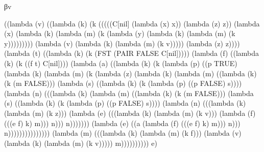 \documentclass[ms,electronic,twosidetoc,letterpaper,chaptercenter,parttop]{byumsphd}
\begin{document}
\begin{theorem}
βv
\begin{schemedisplay}
((lambda (v) ((lambda (k) (k (((((C[nil] (lambda (x) x)) (lambda (z) z))
                    (lambda (x) (lambda (k) (lambda (m) (k (lambda (y) (lambda (k) (lambda (m) (k y)))))))))
                   (lambda (v) (lambda (k) (lambda (m) (k v))))) (lambda (z) z))))
        (lambda (t) ((lambda (k) (k (FST
                         (PAIR FALSE C[nil]))))
               (lambda (f) ((lambda (k) (k ((f t) C[nil])))
                      (lambda (a) ((lambda (k) (k (lambda (p) ((p TRUE)
                                             (lambda (k) (lambda (m) (k (lambda (z) (lambda (k) (lambda (m) ((lambda (k) (k (m FALSE)))
                                                                               (lambda (s) ((lambda (k) (k (lambda (p) ((p FALSE) s))))
                                                                                      (lambda (n) (((lambda (k) (lambda (m) ((lambda (k) (k (m FALSE)))
                                                                                                           (lambda (s) ((lambda (k) (k (lambda (p) ((p FALSE) s))))
                                                                                                                  (lambda (n) (((lambda (k) (lambda (m) (k z)))
                                                                                                                          (lambda (e) (((lambda (k) (lambda (m) (k v)))
                                                                                                                                  (lambda (f) (((e f) k) m))) n))) n)))))))
                                                                                              (lambda (e) ((a (lambda (f) (((e f) k) m))) n))) n)))))))))))))))
                             (lambda (m) (((lambda (k) (lambda (m) (k f)))
                                     (lambda (v) (lambda (k) (lambda (m) (k v))))) m)))))))))) e)
\end{schemedisplay}


\end{theorem}
\end{document}

